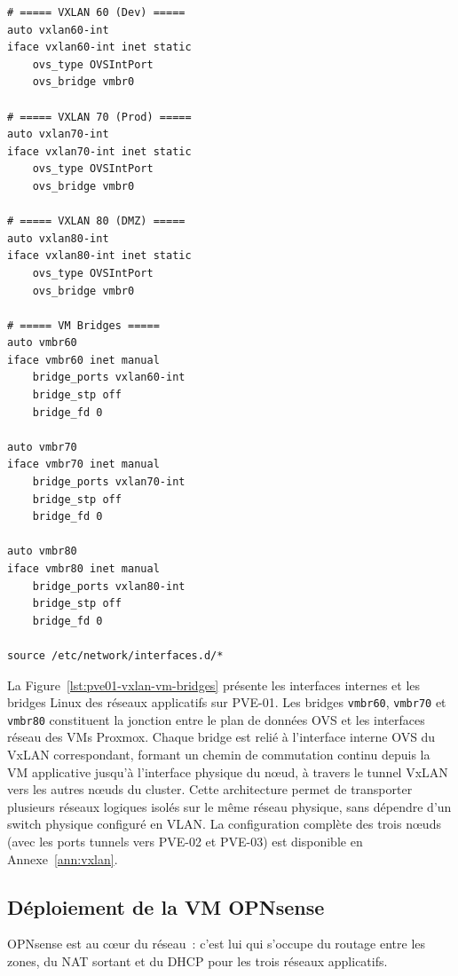\begin{lstlisting}[style=sonacode,language={},caption={VxLAN applicatifs (clés 60, 70, 80) et bridges Linux - PVE-01},label={lst:pve01-vxlan-vm-bridges}]
# ===== VXLAN 60 (Dev) =====
auto vxlan60-int
iface vxlan60-int inet static
    ovs_type OVSIntPort
    ovs_bridge vmbr0

# ===== VXLAN 70 (Prod) =====
auto vxlan70-int
iface vxlan70-int inet static
    ovs_type OVSIntPort
    ovs_bridge vmbr0

# ===== VXLAN 80 (DMZ) =====
auto vxlan80-int
iface vxlan80-int inet static
    ovs_type OVSIntPort
    ovs_bridge vmbr0

# ===== VM Bridges =====
auto vmbr60
iface vmbr60 inet manual
    bridge_ports vxlan60-int
    bridge_stp off
    bridge_fd 0

auto vmbr70
iface vmbr70 inet manual
    bridge_ports vxlan70-int
    bridge_stp off
    bridge_fd 0

auto vmbr80
iface vmbr80 inet manual
    bridge_ports vxlan80-int
    bridge_stp off
    bridge_fd 0

source /etc/network/interfaces.d/*
\end{lstlisting}

\par La Figure~\ref{lst:pve01-vxlan-vm-bridges} présente les interfaces internes et les bridges Linux des réseaux applicatifs sur PVE-01. Les bridges \texttt{vmbr60}, \texttt{vmbr70} et \texttt{vmbr80} constituent la jonction entre le plan de données OVS et les interfaces réseau des VMs Proxmox. Chaque bridge est relié à l'interface interne OVS du VxLAN correspondant, formant un chemin de commutation continu depuis la VM applicative jusqu'à l'interface physique du nœud, à travers le tunnel VxLAN vers les autres nœuds du cluster. Cette architecture permet de transporter plusieurs réseaux logiques isolés sur le même réseau physique, sans dépendre d'un switch physique configuré en VLAN. La configuration complète des trois nœuds (avec les ports tunnels vers PVE-02 et PVE-03) est disponible en Annexe~\ref{ann:vxlan}.\\

\subsection{Déploiement de la VM OPNsense}

\par OPNsense est au cœur du réseau~: c'est lui qui s'occupe du routage entre les zones, du NAT sortant et du DHCP pour les trois réseaux applicatifs.

